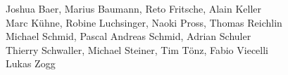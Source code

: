 %
%
%

Joshua Baer,                      %
Marius Baumann,                   %
Reto Fritsche,                    %
Alain Keller%
\\
Marc Kühne,			  %
Robine Luchsinger,                %
Naoki Pross,                      %
Thomas Reichlin%
\\
Michael Schmid,                    %
Pascal Andreas Schmid,            %
Adrian Schuler%
\\
Thierry Schwaller,                %
Michael Steiner,                  %
Tim Tönz,                         %
Fabio Viecelli%
\\
Lukas Zogg%
